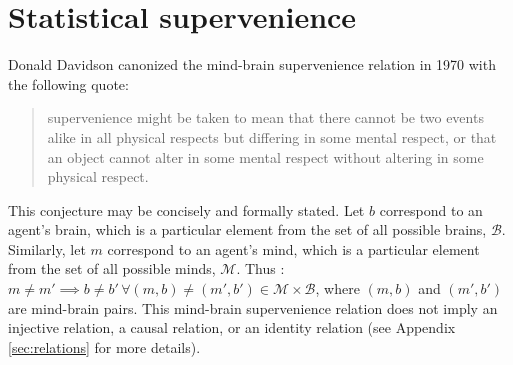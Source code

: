 \documentclass{article}
\newcommand{\mB}{\mathcal{B}}
\newcommand{\mM}{\mathcal{M}}
\providecommand{\mc}[1]{\mathcal{#1}}
\begin{document}


\section{Statistical supervenience} %
\label{sec:preliminaries}



Donald Davidson canonized the mind-brain supervenience relation in 1970 with the following quote: \cite{Davidson70}
\begin{quotation}
\noindent supervenience might be taken to mean that there cannot be two events alike in all physical respects but differing in some mental respect, or that an object cannot alter in some mental respect without altering in some physical respect.
\end{quotation}
This conjecture may be concisely and formally stated.  Let $b$ correspond to an agent's brain, which is a particular element from the set of all possible brains, $\mB$. %
Similarly, let $m$ correspond to an agent's mind, which is a particular element from the set of all possible minds, $\mM$.  %
Thus%
: $m \neq m' \implies b \neq b' \, \forall (m,b) \neq (m',b') \in \mc{M} \times \mc{B}$, where $(m,b)$ and $(m',b')$ are mind-brain pairs.  This mind-brain supervenience relation does not imply an injective relation, a causal relation, or an identity relation (see Appendix \ref{sec:relations} for more details).
\end{document}
